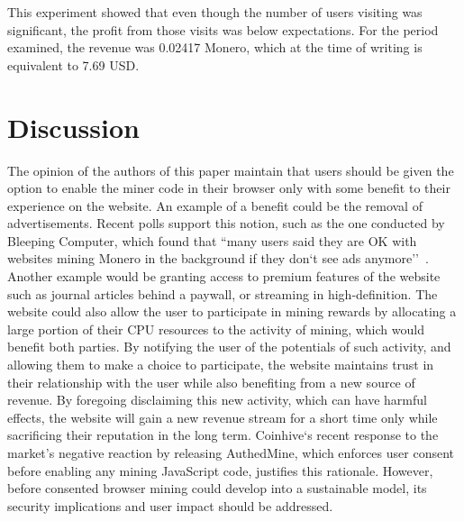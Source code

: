 This experiment showed that even though the number of users visiting was significant, the profit from those visits was below expectations. For the period examined, the revenue was 0.02417 Monero, which at the time of writing is equivalent to 7.69 USD.

\section{Discussion}
The opinion of the authors of this paper maintain that users should be given the option to enable the miner code in their browser only with some benefit to their experience on the website.  An example of a benefit could be the removal of advertisements. Recent polls support this notion, such as the one conducted by Bleeping Computer, which found that ``many users said they are OK with websites mining Monero in the background if they don`t see ads anymore''~\cite{bleepingcomputerminers}. Another example would be granting access to premium features of the website such as journal articles behind a paywall, or streaming in high-definition. The website could also allow the user to participate in mining rewards by allocating a large portion of their CPU resources to the activity of mining, which would benefit both parties. By notifying the user of the potentials of such activity, and allowing them to make a choice to participate, the website maintains trust in their relationship with the user while also benefiting from a new source of revenue. By foregoing disclaiming this new activity, which can have harmful effects, the website will gain a new revenue stream for a short time only while sacrificing their reputation in the long term. Coinhive`s recent response to the market's negative reaction by releasing AuthedMine, which enforces user consent before enabling any mining JavaScript code, justifies this rationale. However, before consented browser mining could develop into a sustainable model, its security implications and user impact should be addressed.

